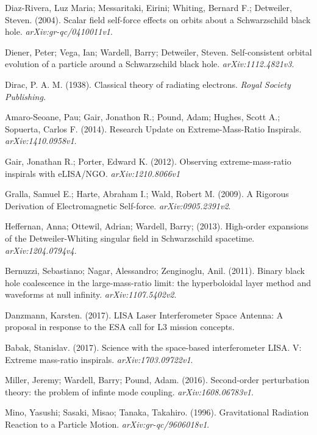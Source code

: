 Diaz-Rivera, Luz Maria; Messaritaki, Eirini; Whiting, Bernard F.; Detweiler, Steven. (2004). Scalar field self-force effects on orbits about a Schwarzschild black hole. {\em arXiv:gr-qc/0410011v1}.

Diener, Peter; Vega, Ian; Wardell, Barry; Detweiler, Steven. Self-consistent orbital evolution of a particle around a Schwarzschild black hole. {\em arXiv:1112.4821v3}.

Dirac, P. A. M. (1938). Classical theory of radiating electrons. {\em Royal Society Publishing.}

Amaro-Seoane, Pau; Gair, Jonathon R.; Pound, Adam; Hughes, Scott A.; Sopuerta, Carlos F. (2014). Research Update on Extreme-Mass-Ratio Inspirals. {\em arXiv:1410.0958v1}.

Gair, Jonathan R.; Porter, Edward K. (2012). Observing extreme-mass-ratio inspirals with eLISA/NGO. {\em arXiv:1210.8066v1}

Gralla, Samuel E.; Harte, Abraham I.; Wald, Robert M. (2009). A Rigorous Derivation of Electromagnetic Self-force. {\em arXiv:0905.2391v2}.

Heffernan, Anna; Ottewil, Adrian; Wardell, Barry; (2013). High-order expansions of the Detweiler-Whiting singular field in Schwarzschild spacetime. {\em arXiv:1204.0794v4}.

Bernuzzi, Sebastiano; Nagar, Alessandro; Zenginoglu, Anil. (2011). Binary black hole coalescence in the large-mass-ratio limit: the hyperboloidal layer method and waveforms at null infinity. {\em arXiv:1107.5402v2}.

Danzmann, Karsten. (2017). LISA Laser Interferometer Space Antenna: A proposal in response to the ESA call for L3 mission concepts. 

Babak, Stanislav. (2017). Science with the space-based interferometer LISA. V: Extreme mass-ratio inspirals. {\em arXiv:1703.09722v1}.

Miller, Jeremy; Wardell, Barry; Pound, Adam. (2016). Second-order perturbation theory: the problem of infinte mode coupling. {\em arXiv:1608.06783v1}.

Mino, Yasushi; Sasaki, Misao; Tanaka, Takahiro. (1996). Gravitational Radiation Reaction to a Particle Motion. {\em arXiv:gr-qc/9606018v1}.


